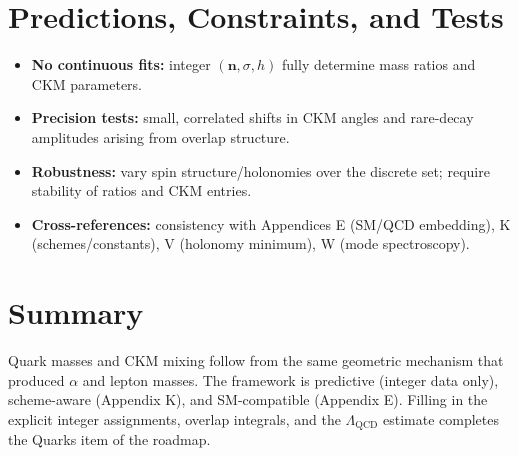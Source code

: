 \section{Predictions, Constraints, and Tests}
\label{sec:QA_tests}
\begin{itemize}
  \item \textbf{No continuous fits:} integer $(\mathbf{n},\sigma,h)$ fully determine mass ratios and CKM parameters.
  \item \textbf{Precision tests:} small, correlated shifts in CKM angles and rare-decay amplitudes arising from overlap structure.
  \item \textbf{Robustness:} vary spin structure/holonomies over the discrete set; require stability of ratios and CKM entries.
  \item \textbf{Cross-references:} consistency with Appendices E (SM/QCD embedding), K (schemes/constants), V (holonomy minimum), W (mode spectroscopy).
\end{itemize}

\section*{Summary}
Quark masses and CKM mixing follow from the same geometric mechanism that produced $\alpha$ and lepton masses.
The framework is predictive (integer data only), scheme-aware (Appendix K), and SM-compatible (Appendix E).
Filling in the explicit integer assignments, overlap integrals, and the $\Lambda_{\mathrm{QCD}}$ estimate completes the Quarks item of the roadmap.
